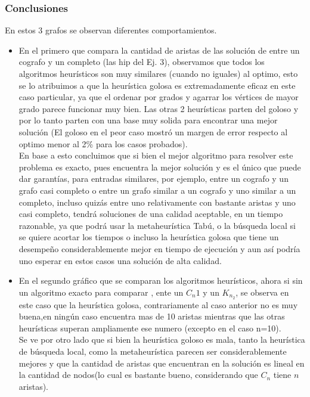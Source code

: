\subsubsection*{Conclusiones}\;
En estos 3 grafos se observan diferentes comportamientos.\\
\begin{itemize}
\item En el primero que compara la cantidad de aristas de las solución de entre un cografo y un completo (las hip del Ej. 3), observamos que todos los algoritmos heurísticos son muy similares (cuando no iguales) al optimo, esto se lo atribuimos a que la heurística golosa es extremadamente eficaz en este caso particular, ya que el ordenar por grados y agarrar los vértices de mayor grado parece funcionar muy bien. Las otras 2 heurísticas parten del goloso y por lo tanto parten con una base muy solida para encontrar una mejor solución (El goloso en el peor caso mostró un margen de error respecto al optimo menor al 2\% para los casos probados).\\
En base a esto concluimos que si bien el mejor algoritmo para resolver este problema es exacto, pues encuentra la mejor solución y es el único que puede dar garantías, para entradas similares, por ejemplo, entre un cografo y un grafo casi completo o entre un grafo similar a un cografo y uno similar a un completo, incluso quizás entre uno relativamente con bastante aristas y uno casi completo, tendrá soluciones de una calidad aceptable, en un tiempo razonable, ya que podrá usar la metaheurística Tabú, o la búsqueda local si se quiere acortar los tiempos o incluso la heurística golosa que tiene un desempeño considerablemente mejor en tiempo de ejecución y aun así podría uno esperar en estos casos una solución de alta calidad.\\
\item En el segundo gráfico que se comparan los algoritmos heurísticos, ahora si sin un algoritmo exacto para comparar , ente un $C_n1$ y un $K_{n_2}$, se observa en este caso que la heurística golosa, contrariamente al caso anterior no es muy buena,en ningún caso encuentra mas de 10 aristas mientras que las otras heurísticas superan ampliamente ese numero (excepto en el caso n=10).\\
Se ve por otro lado que si bien la heurística goloso es mala, tanto la heurística de búsqueda local, como la metaheurística parecen ser considerablemente mejores y que la cantidad de aristas que encuentran en la solución es lineal en la cantidad de nodos(lo cual es bastante bueno, considerando que $C_n$ tiene $n$ aristas).\\

\end{itemize}
